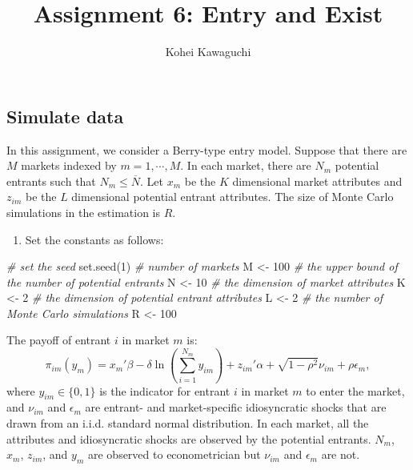 \documentclass[
]{article}
\title{Assignment 6: Entry and Exist}
\author{Kohei Kawaguchi}
\date{}
\newenvironment{Shaded}{\begin{snugshade}}{\end{snugshade}}
\newcommand{\CommentTok}[1]{\textcolor[rgb]{0.56,0.35,0.01}{\textit{#1}}}
\newcommand{\DecValTok}[1]{\textcolor[rgb]{0.00,0.00,0.81}{#1}}
\newcommand{\FunctionTok}[1]{\textcolor[rgb]{0.00,0.00,0.00}{#1}}
\newcommand{\NormalTok}[1]{#1}
\newcommand{\OtherTok}[1]{\textcolor[rgb]{0.56,0.35,0.01}{#1}}
\providecommand{\tightlist}{%
  \setlength{\itemsep}{0pt}\setlength{\parskip}{0pt}}
\begin{document}
\maketitle

\hypertarget{simulate-data}{%
\subsection{Simulate data}\label{simulate-data}}

In this assignment, we consider a Berry-type entry model. Suppose that
there are \(M\) markets indexed by \(m = 1, \cdots, M\). In each market,
there are \(N_m\) potential entrants such that \(N_m \le \overline{N}\).
Let \(x_m\) be the \(K\) dimensional market attributes and \(z_{im}\) be
the \(L\) dimensional potential entrant attributes. The size of Monte
Carlo simulations in the estimation is \(R\).

\begin{enumerate}
\def\labelenumi{\arabic{enumi}.}
\tightlist
\item
  Set the constants as follows:
\end{enumerate}

\begin{Shaded}
\begin{Highlighting}[]
\CommentTok{\# set the seed}
\FunctionTok{set.seed}\NormalTok{(}\DecValTok{1}\NormalTok{)}
\CommentTok{\# number of markets}
\NormalTok{M }\OtherTok{\textless{}{-}} \DecValTok{100}
\CommentTok{\# the upper bound of the number of potential entrants}
\NormalTok{N }\OtherTok{\textless{}{-}} \DecValTok{10}
\CommentTok{\# the dimension of market attributes}
\NormalTok{K }\OtherTok{\textless{}{-}} \DecValTok{2}
\CommentTok{\# the dimension of potential entrant attributes}
\NormalTok{L }\OtherTok{\textless{}{-}} \DecValTok{2}
\CommentTok{\# the number of Monte Carlo simulations}
\NormalTok{R }\OtherTok{\textless{}{-}} \DecValTok{100}
\end{Highlighting}
\end{Shaded}

The payoff of entrant \(i\) in market \(m\) is: \[
\pi_{im}(y_m) = x_m'\beta - \delta \ln \left(\sum_{i = 1}^{N_m} y_{im}\right) + z_{im}'\alpha + \sqrt{1 - \rho^2} \nu_{im} + \rho \epsilon_{m},
\] where \(y_{im} \in \{0, 1\}\) is the indicator for entrant \(i\) in
market \(m\) to enter the market, and \(\nu_{im}\) and \(\epsilon_m\)
are entrant- and market-specific idiosyncratic shocks that are drawn
from an i.i.d. standard normal distribution. In each market, all the
attributes and idiosyncratic shocks are observed by the potential
entrants. \(N_m\), \(x_m\), \(z_{im}\), and \(y_m\) are observed to
econometrician but \(\nu_{im}\) and \(\epsilon_m\) are not.
\end{document}
